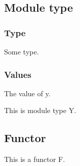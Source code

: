 \subsection{Module type\label{Nested--module-type}}%
\label{Nested--module-type-Y}\label{Nested-module-type-Y}\begin{ocamlindent}\subsubsection{Type\label{Nested-module-type-Y--type_2}}%
\label{Nested-module-type-Y--type-t}\begin{ocamlindent}Some type.\end{ocamlindent}%
\medbreak
\subsubsection{Values\label{Nested-module-type-Y--values_2}}%
\label{Nested-module-type-Y--val-y}\begin{ocamlindent}The value of y.\end{ocamlindent}%
\medbreak
\end{ocamlindent}%
\begin{ocamlindent}This is module type Y.\end{ocamlindent}%
\medbreak
\subsection{Functor\label{Nested--functor}}%
\label{Nested--module-F}\begin{ocamlindent}This is a functor F.\end{ocamlindent}%
\medbreak
